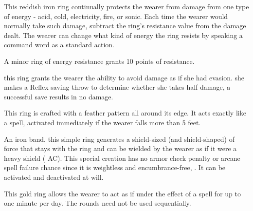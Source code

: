 
 This reddish iron ring continually protects the wearer from damage from one type of energy - acid, cold, electricity, fire, or sonic. Each time the wearer would normally take such damage, subtract the ring's resistance value from the damage dealt. The wearer can change what kind of energy the ring resists by speaking a command word as a standard action.

A minor ring of energy resistance grants 10 points of resistance.


  this ring grants the wearer the ability to avoid damage as if she had evasion.  she makes a Reflex saving throw  to determine whether she takes half damage, a successful save results in no damage.


 This ring is crafted with a feather pattern all around its edge. It acts exactly like a  spell, activated immediately if the wearer falls more than 5 feet.


 An iron band, this simple ring generates a shield-sized (and shield-shaped)  of force that stays with the ring and can be wielded by the wearer as if it were a heavy shield ( AC). This special creation has no armor check penalty or arcane spell failure chance since it is weightless and encumbrance-free, . It can be activated and deactivated at will.


 This gold ring allows the wearer to act as if under the effect of a  spell for up to one minute per day. The rounds need not be used sequentially.

